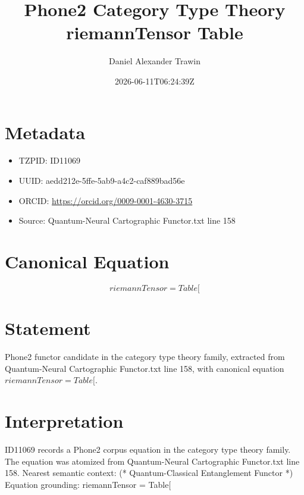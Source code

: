 \documentclass[11pt]{article}
\title{Phone2 Category Type Theory riemannTensor Table}
\author{Daniel Alexander Trawin}
\date{2026-06-11T06:24:39Z}
\begin{document}
\maketitle
\section*{Metadata}
\begin{itemize}
\item TZPID: ID11069
\item UUID: aedd212e-5ffe-5ab9-a4c2-caf889bad56e
\item ORCID: \url{https://orcid.org/0009-0001-4630-3715}
\item Source: Quantum-Neural Cartographic Functor.txt line 158
\end{itemize}
\section*{Canonical Equation}
\[
riemannTensor = Table[
\]
\section*{Statement}
Phone2 functor candidate in the category type theory family, extracted from Quantum-Neural Cartographic Functor.txt line 158, with canonical equation $riemannTensor = Table[$.
\section*{Interpretation}
ID11069 records a Phone2 corpus equation in the category type theory family. The equation was atomized from Quantum-Neural Cartographic Functor.txt line 158. Nearest semantic context: (* Quantum-Classical Entanglement Functor *) Equation grounding: riemannTensor = Table[
\end{document}
